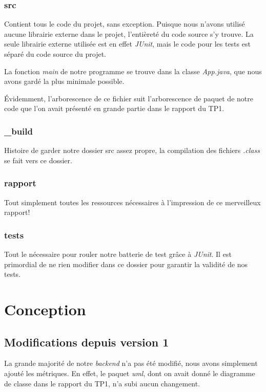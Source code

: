 \documentclass[letter,french]{report}
\begin{document}
	\subsubsection*{src}
  Contient tous le code du projet, sans exception. Puisque nous n'avons utilisé
  aucune librairie externe dans le projet, l'entièreté du code source s'y trouve.
  La seule librairie externe utilisée est en effet \emph{JUnit}, mais le code
  pour les tests est séparé du code source du projet.

  La fonction \emph{main} de notre programme se trouve dans la classe
  \emph{App.java}, que nous avons gardé la plus minimale possible.

  Évidemment, l'arborescence de ce fichier suit l'arborescence de paquet de
  notre code que l'on avait présenté en grande partie dans le rapport du TP1.

	\subsubsection*{\_build}
  Histoire de garder notre dossier src assez propre, la compilation des fichiers
  \emph{.class} se fait vers ce dossier.

	\subsubsection*{rapport}
  Tout simplement toutes les ressources nécessaires à l'impression de ce
  merveilleux rapport!

  \subsubsection*{tests}
  Tout le nécessaire pour rouler notre batterie de test grâce à \emph{JUnit}. Il
  est primordial de ne rien modifier dans ce dossier pour garantir la validité
  de nos tests.
	
	\section*{Conception}

  \subsection*{Modifications depuis version 1}

  La grande majorité de notre \emph{backend} n'a pas été modifié, nous avons
  simplement ajouté les métriques. En effet, le
  paquet \emph{uml}, dont on avait donné le diagramme de classe dans le rapport
  du TP1, n'a subi aucun changement.
\end{document}
